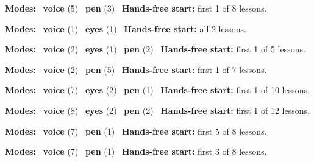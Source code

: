 \expandafter\def\csname hlchaptermodality6\endcsname{%
  {\small\noindent
    \textbf{Modes:} \hlvoicesign{}~\textbf{voice} (5) \quad \hlpensign{}~\textbf{pen} (3)\quad
    \hlvoicesign{}~\textbf{Hands-free start:} first 1 of 8 lessons.%
    \par}\medskip
}

\expandafter\def\csname hlchaptermodality7\endcsname{%
  {\small\noindent
    \textbf{Modes:} \hlvoicesign{}~\textbf{voice} (1) \quad \hlsightsign{}~\textbf{eyes} (1)\quad
    \hlvoicesign{}~\textbf{Hands-free start:} all 2 lessons.%
    \par}\medskip
}

\expandafter\def\csname hlchaptermodality8\endcsname{%
  {\small\noindent
    \textbf{Modes:} \hlvoicesign{}~\textbf{voice} (2) \quad \hlsightsign{}~\textbf{eyes} (1) \quad \hlpensign{}~\textbf{pen} (2)\quad
    \hlvoicesign{}~\textbf{Hands-free start:} first 1 of 5 lessons.%
    \par}\medskip
}

\expandafter\def\csname hlchaptermodality9\endcsname{%
  {\small\noindent
    \textbf{Modes:} \hlvoicesign{}~\textbf{voice} (2) \quad \hlpensign{}~\textbf{pen} (5)\quad
    \hlvoicesign{}~\textbf{Hands-free start:} first 1 of 7 lessons.%
    \par}\medskip
}

\expandafter\def\csname hlchaptermodality10\endcsname{%
  {\small\noindent
    \textbf{Modes:} \hlvoicesign{}~\textbf{voice} (7) \quad \hlsightsign{}~\textbf{eyes} (2) \quad \hlpensign{}~\textbf{pen} (1)\quad
    \hlvoicesign{}~\textbf{Hands-free start:} first 1 of 10 lessons.%
    \par}\medskip
}

\expandafter\def\csname hlchaptermodality11\endcsname{%
  {\small\noindent
    \textbf{Modes:} \hlvoicesign{}~\textbf{voice} (8) \quad \hlsightsign{}~\textbf{eyes} (2) \quad \hlpensign{}~\textbf{pen} (2)\quad
    \hlvoicesign{}~\textbf{Hands-free start:} first 1 of 12 lessons.%
    \par}\medskip
}

\expandafter\def\csname hlchaptermodality12\endcsname{%
  {\small\noindent
    \textbf{Modes:} \hlvoicesign{}~\textbf{voice} (7) \quad \hlpensign{}~\textbf{pen} (1)\quad
    \hlvoicesign{}~\textbf{Hands-free start:} first 5 of 8 lessons.%
    \par}\medskip
}

\expandafter\def\csname hlchaptermodality13\endcsname{%
  {\small\noindent
    \textbf{Modes:} \hlvoicesign{}~\textbf{voice} (7) \quad \hlpensign{}~\textbf{pen} (1)\quad
    \hlvoicesign{}~\textbf{Hands-free start:} first 3 of 8 lessons.%
    \par}\medskip
}

